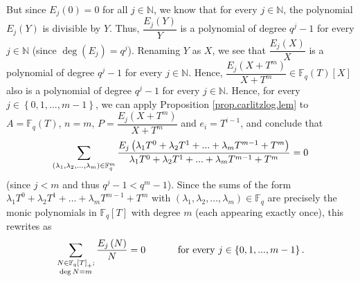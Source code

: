 \documentclass[numbers=enddot,12pt,final,onecolumn,notitlepage]{scrartcl}%
\theoremstyle{definition}
\let\sumnonlimits\sum
\renewcommand{\sum}{\sumnonlimits\limits}
\begin{document}
But since $E_{j}\left(  0\right)  =0$ for all $j\in\mathbb{N}$, we know that
for every $j\in\mathbb{N}$, the polynomial $E_{j}\left(  Y\right)  $ is
divisible by $Y$. Thus, $\dfrac{E_{j}\left(  Y\right)  }{Y}$ is a polynomial
of degree $q^{j}-1$ for every $j\in\mathbb{N}$ (since $\deg\left(
E_{j}\right)  =q^{j}$). Renaming $Y$ as $X$, we see that $\dfrac{E_{j}\left(
X\right)  }{X}$ is a polynomial of degree $q^{j}-1$ for every $j\in\mathbb{N}%
$. Hence, $\dfrac{E_{j}\left(  X+T^{m}\right)  }{X+T^{m}}\in\mathbb{F}%
_{q}\left(  T\right)  \left[  X\right]  $ also is a polynomial of degree
$q^{j}-1$ for every $j\in\mathbb{N}$. Hence, for every $j\in\left\{
0,1,...,m-1\right\}  $, we can apply Proposition \ref{prop.carlitzlog.lem} to
$A=\mathbb{F}_{q}\left(  T\right)  $, $n=m$, $P=\dfrac{E_{j}\left(
X+T^{m}\right)  }{X+T^{m}}$ and $e_{i}=T^{i-1}$, and conclude that
\[
\sum\limits_{\left(  \lambda_{1},\lambda_{2},...,\lambda_{m}\right)
\in\mathbb{F}_{q}^{m}}\dfrac{E_{j}\left(  \lambda_{1}T^{0}+\lambda_{2}%
T^{1}+...+\lambda_{m}T^{m-1}+T^{m}\right)  }{\lambda_{1}T^{0}+\lambda_{2}%
T^{1}+...+\lambda_{m}T^{m-1}+T^{m}}=0
\]
(since $j<m$ and thus $q^{j}-1<q^{m}-1$). Since the sums of the form
$\lambda_{1}T^{0}+\lambda_{2}T^{1}+...+\lambda_{m}T^{m-1}+T^{m}$ with $\left(
\lambda_{1},\lambda_{2},...,\lambda_{m}\right)  \in\mathbb{F}_{q}$ are
precisely the monic polynomials in $\mathbb{F}_{q}\left[  T\right]  $ with
degree $m$ (each appearing exactly once), this rewrites as%
\begin{equation}
\sum\limits_{\substack{N\in\mathbb{F}_{q}\left[  T\right]  _{+};\\\deg
N=m}}\dfrac{E_{j}\left(  N\right)  }{N}=0\ \ \ \ \ \ \ \ \ \ \text{for every
}j\in\left\{  0,1,...,m-1\right\}  \text{.} \label{pf.carlitzlog.lem2.8}%
\end{equation}
\end{document}
